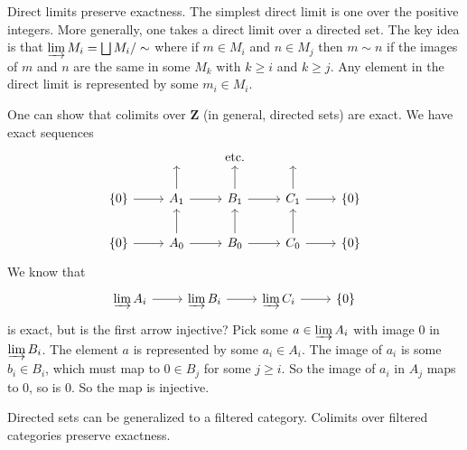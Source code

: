 \documentclass[11pt, oneside,margin=1in]{article}
\begin{document}
Direct limits preserve exactness. The simplest direct limit is one over the positive integers. More generally, one takes a direct limit over a directed set. The key idea is that $\varinjlim M_i = \bigsqcup M_i/\sim$ where if $m\in M_i$ and $n\in M_j$ then $m\sim n$ if the images of $m$ and $n$ are the same in some $M_k$ with $k\ge i $ and $k\ge j$. Any element in the direct limit is represented by some $m_i\in M_i$.

One can show that colimits over $\mathbf{Z}$ (in general, directed sets) are exact. We have exact sequences 
\[
\begin{tikzcd}
	 &\textrm{ } & \textrm{etc.} &\textrm{ } & \\
	\{0\} \arrow[r] & A_1 \arrow[r] \arrow[u] & B_1 \arrow[r] \arrow[u] & C_1 \arrow[r] \arrow[u] & \{0\}\\
	\{0\} \arrow[r] & A_0 \arrow[r] \arrow[u] & B_0 \arrow[r] \arrow[u] & C_0 \arrow[r] \arrow[u] & \{0\} 
\end{tikzcd}
\]
We know that 
\[
\begin{tikzcd}
	\varinjlim A_i \arrow[r] & \varinjlim B_i \arrow[r] & \varinjlim C_i \arrow[r] & \{0\}
\end{tikzcd}
\]
is exact, but is the first arrow injective? Pick some $a\in \varinjlim A_i$ with image $0$ in $\varinjlim B_i$. The element $a$ is represented by some $a_i\in A_i$. The image of $a_i$ is some $b_i\in B_i$, which must map to $0\in B_j$ for some $j\ge i$. So the image of $a_i$ in $A_j$ maps to $0$, so is $0$. So the map is injective.

Directed sets can be generalized to a {filtered category}. Colimits over filtered categories preserve exactness. 
\end{document}
